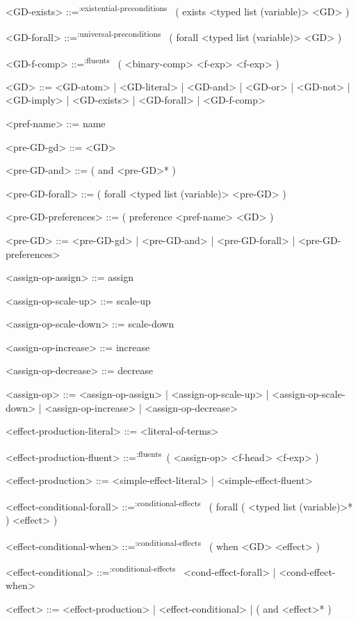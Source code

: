 \documentclass[]{article}
\newcommand{\fluents}{\textsuperscript{:fluents}~}
\newcommand{\existentialpreconditions}{\textsuperscript{:existential-preconditions}~}
\newcommand{\universalpreconditions}{\textsuperscript{:universal-preconditions}~}
\newcommand{\conditionaleffects}{\textsuperscript{:conditional-effects}~}
\begin{document}
\begin{grammar}
    <GD-exists> ::=\existentialpreconditions{} ( exists <typed list (variable)> <GD> )

    <GD-forall> ::=\universalpreconditions{} ( forall <typed list (variable)> <GD> )

    <GD-f-comp> ::=\fluents{} ( <binary-comp> <f-exp> <f-exp> )

    <GD> ::= <GD-atom> | <GD-literal> | <GD-and> | <GD-or> | <GD-not> | <GD-imply> | <GD-exists> | <GD-forall> | <GD-f-comp>

    <pref-name> ::= name

    <pre-GD-gd> ::= <GD>

    <pre-GD-and> ::= ( and <pre-GD>* )

    <pre-GD-forall> ::= ( forall <typed list (variable)> <pre-GD> )

    <pre-GD-preferences> ::= ( preference <pref-name> <GD> )

    <pre-GD> ::= <pre-GD-gd> | <pre-GD-and> | <pre-GD-forall> | <pre-GD-preferences>


    <assign-op-assign> ::= assign

    <assign-op-scale-up> ::= scale-up

    <assign-op-scale-down> ::= scale-down

    <assign-op-increase> ::= increase

    <assign-op-decrease> ::= decrease

    <assign-op> ::= <assign-op-assign> | <assign-op-scale-up> | <assign-op-scale-down>\newline
        | <assign-op-increase> | <assign-op-decrease>

    <effect-production-literal> ::= <literal-of-terms>

    <effect-production-fluent> ::=\fluents ( <assign-op> <f-head> <f-exp> )

    <effect-production> ::= <simple-effect-literal> | <simple-effect-fluent>

    <effect-conditional-forall> ::=\conditionaleffects{} ( forall ( <typed list (variable)>* ) <effect> )

    <effect-conditional-when> ::=\conditionaleffects{} ( when <GD> <effect> )

    <effect-conditional> ::=\conditionaleffects{} <cond-effect-forall> | <cond-effect-when>

    <effect> ::= <effect-production> | <effect-conditional> | ( and <effect>* )
\end{grammar}
\end{document}
